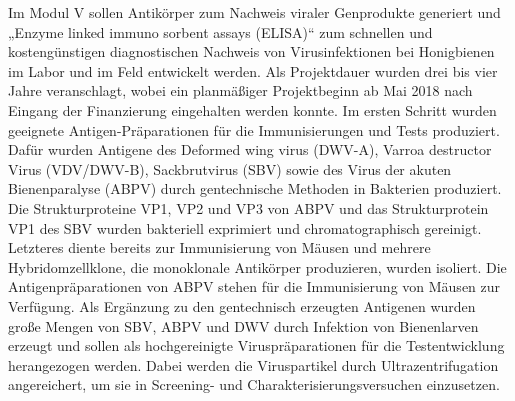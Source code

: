 Im Modul V sollen Antikörper zum Nachweis viraler Genprodukte generiert und „Enzyme linked immuno sorbent assays (ELISA)“ zum schnellen und kostengünstigen diagnostischen Nachweis von Virusinfektionen bei Honigbienen im Labor und im Feld entwickelt werden. Als Projektdauer wurden drei bis vier Jahre veranschlagt, wobei ein planmäßiger Projektbeginn ab Mai 2018 nach Eingang der Finanzierung eingehalten werden konnte. Im ersten Schritt wurden geeignete Antigen-Präparationen für die Immunisierungen und Tests produziert. Dafür wurden Antigene des Deformed wing virus (DWV-A), Varroa destructor Virus (VDV/DWV-B), Sackbrutvirus (SBV) sowie des Virus der akuten Bienenparalyse (ABPV) durch gentechnische Methoden in Bakterien produziert. Die Strukturproteine VP1, VP2 und VP3 von ABPV und das Strukturprotein VP1 des SBV wurden bakteriell exprimiert und chromatographisch gereinigt. Letzteres diente bereits zur Immunisierung von Mäusen und mehrere Hybridomzellklone, die monoklonale Antikörper produzieren, wurden isoliert. Die Antigenpräparationen von ABPV stehen für die Immunisierung von Mäusen zur Verfügung. Als Ergänzung zu den gentechnisch erzeugten Antigenen wurden große Mengen von SBV, ABPV und DWV durch Infektion von Bienenlarven erzeugt und sollen als hochgereinigte Viruspräparationen für die Testentwicklung herangezogen werden. Dabei werden die Viruspartikel durch Ultrazentrifugation angereichert, um sie in Screening- und Charakterisierungsversuchen einzusetzen.